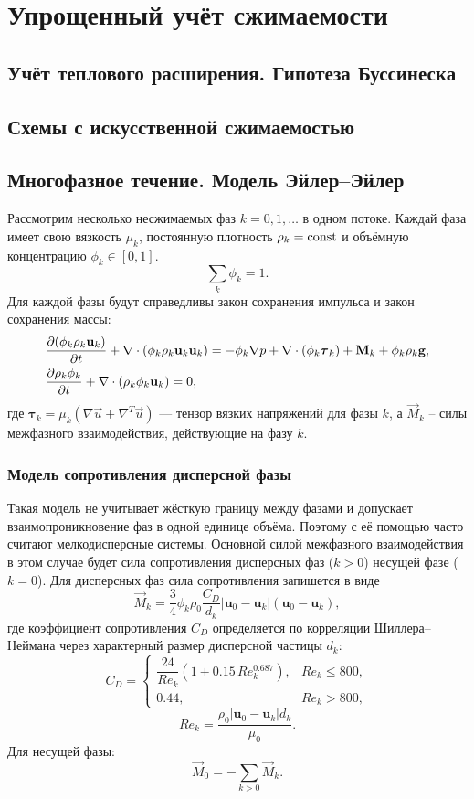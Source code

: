 \section{Упрощенный учёт сжимаемости}
\subsection{Учёт теплового расширения. Гипотеза Буссинеска}

\subsection{Схемы с искусственной сжимаемостью}

\subsection{Многофазное течение. Модель Эйлер--Эйлер}
Рассмотрим несколько несжимаемых фаз $k=0,1,\dots$ в одном потоке.
Каждай фаза имеет свою вязкость $\mu_k$, постоянную плотность $\rho_k = {\rm const}$
и объёмную концентрацию $\phi_k \in [0, 1]$.
\begin{equation}
\label{eq:euler-euler-unitsum}
\sum_k \phi_k = 1.
\end{equation}
Для каждой фазы будут справедливы закон сохранения импульса и закон сохранения массы:
\begin{align}
\label{eq:euler-euler-mom}
&\frac{\partial (\phi_k \rho_k \mathbf{u}_k)}{\partial t} + \nabla \cdot (\phi_k \rho_k \mathbf{u}_k \mathbf{u}_k) = 
-\phi_k \nabla p + \nabla \cdot (\phi_k \boldsymbol{\tau}_k) + \mathbf{M}_k + \phi_k \rho_k \mathbf{g}, \\
\label{eq:euler-euler-mass}
&\frac{\partial \rho_k \phi_k}{\partial t} + \nabla\cdot\left(\rho_k \phi_k \boldsymbol{\rm u}_k\right) = 0,
\end{align}
где \(\boldsymbol{\tau}_k = \mu_k\left(\nabla\vec u + \nabla^T \vec u\right)\) — тензор вязких напряжений для фазы \(k\),
а $\vec M_k$ -- силы межфазного взаимодействия, действующие на фазу $k$.

\subsubsection{Модель сопротивления дисперсной фазы}
\label{sec:schiller-naumann}
Такая модель не учитывает жёсткую границу между фазами и допускает взаимопроникновение фаз
в одной единице объёма. Поэтому с её помощью часто считают мелкодисперсные системы.
Основной силой межфазного взаимодействия в этом случае будет сила сопротивления
дисперсных фаз ($k>0$) несущей фазе ($k=0$).
Для дисперсных фаз сила сопротивления запишется в виде
\[
\vec M_k = \frac{3}{4} \phi_k \rho_0 \frac{C_D}{d_k} 
|\mathbf{u}_0 - \mathbf{u}_k| (\mathbf{u}_0 - \mathbf{u}_k),
\]
где коэффициент сопротивления \(C_D\) определяется по корреляции Шиллера–Неймана через характерный размер дисперсной частицы $d_k$:
\[
C_D = 
\begin{cases}
\dfrac{24}{Re_k} \left(1 + 0.15\, Re_k^{0.687}\right), & Re_k \le 800, \\[10pt]
0.44, & Re_k > 800,
\end{cases}
\]
\[
Re_k = \frac{\rho_0 |\mathbf{u}_0 - \mathbf{u}_k| d_k}{\mu_0}.
\]
Для несущей фазы:
\[
\vec M_0 = -\sum_{k>0} \vec M_k.
\]

